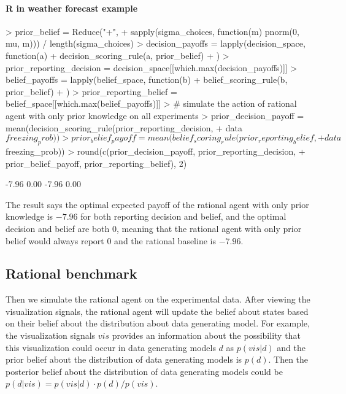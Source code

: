 \documentclass{article}
\begin{document}
\paragraph{R in weather forecast example}

\begin{Schunk}
\begin{Sinput}
> prior_belief = Reduce("+", 
+   sapply(sigma_choices, function(m) {pnorm(0, mu, m)})) / length(sigma_choices)
> decision_payoffs = lapply(decision_space, function(a) {
+   decision_scoring_rule(a, prior_belief)
+ })
> prior_reporting_decision = decision_space[[which.max(decision_payoffs)]]
> belief_payoffs = lapply(belief_space, function(b) {
+   belief_scoring_rule(b, prior_belief)
+ })
> prior_reporting_belief = belief_space[[which.max(belief_payoffs)]]
> # simulate the action of rational agent with only prior knowledge on all experiments
> prior_decision_payoff = mean(decision_scoring_rule(prior_reporting_decision, 
+                                                    data$freezing_prob))
> prior_belief_payoff = mean(belief_scoring_rule(prior_reporting_belief, 
+                                                data$freezing_prob))
> round(c(prior_decision_payoff, prior_reporting_decision, 
+         prior_belief_payoff, prior_reporting_belief), 2)
\end{Sinput}
\begin{Soutput}
[1] -7.96  0.00 -7.96  0.00
\end{Soutput}
\end{Schunk}

The result says the optimal expected payoff of the rational agent with only prior knowledge is $-7.96$ for both reporting decision and belief, and the optimal decision and belief are both $0$, meaning that the rational agent with only prior belief would always report $0$ and the rational baseline is $-7.96$.

\subsection{Rational benchmark}

Then we simulate the rational agent on the experimental data. After viewing the visualization signals, the rational agent will update the belief about states based on their belief about the distribution about data generating model. For example, the visualization signals $vis$ provides an information about the possibility that this visualization could occur in data generating models $d$ as $p(vis|d)$ and the prior belief about the distribution of data generating models is $p(d)$. Then the posterior belief about the distribution of data generating models could be $p(d|vis) = p(vis|d) \cdot p(d) / p(vis)$.
\end{document}

